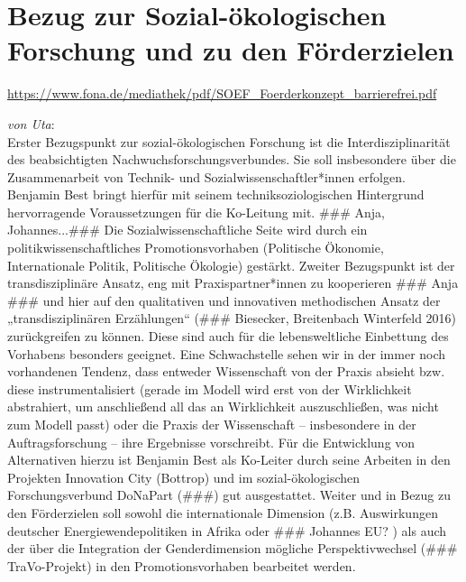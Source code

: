 \documentclass[a4paper,11pt,twoside]{scrartcl}
\begin{document}
\section{Bezug zur Sozial-ökologischen Forschung und zu den Förderzielen}

\url{https://www.fona.de/mediathek/pdf/SOEF_Foerderkonzept_barrierefrei.pdf}


\textit{von Uta}:\\
Erster Bezugspunkt zur sozial-ökologischen Forschung ist die Interdisziplinarität des beabsichtigten Nachwuchsforschungsverbundes. Sie soll insbesondere über die Zusammenarbeit von Technik- und Sozialwissenschaftler*innen erfolgen. Benjamin Best bringt hierfür mit seinem techniksoziologischen Hintergrund hervorragende Voraussetzungen für die Ko-Leitung mit. ### Anja, Johannes...### Die Sozialwissenschaftliche Seite wird durch ein politikwissenschaftliches Promotionsvorhaben (Politische Ökonomie, Internationale Politik, Politische Ökologie) gestärkt.
Zweiter Bezugspunkt ist der transdisziplinäre Ansatz, eng mit Praxispartner*innen zu kooperieren ### Anja ### und hier auf den qualitativen und innovativen methodischen Ansatz der „transdisziplinären Erzählungen“ (### Biesecker, Breitenbach Winterfeld 2016) zurückgreifen zu können. Diese sind auch für die lebensweltliche Einbettung des Vorhabens besonders geeignet. Eine Schwachstelle sehen wir in der immer noch vorhandenen Tendenz, dass entweder Wissenschaft von der Praxis absieht bzw. diese instrumentalisiert (gerade im Modell wird erst von der Wirklichkeit abstrahiert, um anschließend all das an Wirklichkeit auszuschließen, was nicht zum Modell passt) oder die Praxis der Wissenschaft – insbesondere in der Auftragsforschung – ihre Ergebnisse vorschreibt. Für die Entwicklung von Alternativen hierzu ist Benjamin Best als Ko-Leiter durch seine Arbeiten in den Projekten Innovation City (Bottrop) und im sozial-ökologischen Forschungsverbund DoNaPart (###) gut ausgestattet.
Weiter und in Bezug zu den Förderzielen soll sowohl die internationale Dimension (z.B. Auswirkungen deutscher Energiewendepolitiken in Afrika oder ### Johannes EU? ) als auch der über die Integration der Genderdimension mögliche Perspektivwechsel (### TraVo-Projekt) in den Promotionsvorhaben bearbeitet werden.
\end{document}
